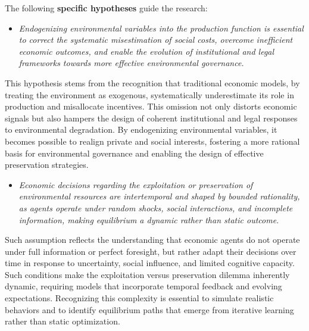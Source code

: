 The following \textbf{specific hypotheses} guide the research:

\begin{itemize} 

    \item[\textbf{H1.}] 
    
    \textit{Endogenizing environmental variables into the production function is essential to correct the systematic misestimation of social costs, overcome inefficient economic outcomes, and enable the evolution of institutional and legal frameworks towards more effective environmental governance.}
    
\end{itemize}

This hypothesis stems from the recognition that traditional economic models, by treating the environment as exogenous, systematically underestimate its role in production and misallocate incentives. This omission not only distorts economic signals but also hampers the design of coherent institutional and legal responses to environmental degradation. By endogenizing environmental variables, it becomes possible to realign private and social interests, fostering a more rational basis for environmental governance and enabling the design of effective preservation strategies.

\begin{itemize}

    \item[\textbf{H2.}] 
    
    \textit{Economic decisions regarding the exploitation or preservation of environmental resources are intertemporal and shaped by bounded rationality, as agents operate under random shocks, social interactions, and incomplete information, making equilibrium a dynamic rather than static outcome.}
    
\end{itemize}

Such assumption reflects the understanding that economic agents do not operate under full information or perfect foresight, but rather adapt their decisions over time in response to uncertainty, social influence, and limited cognitive capacity. Such conditions make the exploitation versus preservation dilemma inherently dynamic, requiring models that incorporate temporal feedback and evolving expectations. Recognizing this complexity is essential to simulate realistic behaviors and to identify equilibrium paths that emerge from iterative learning rather than static optimization. 


